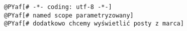 \begin{Verbatim}[commandchars=@\[\]]
@PYaf[# -*- coding: utf-8 -*-]
@PYaf[# named scope parametryzowany]
@PYaf[# dodatkowo chcemy wyświetlić posty z marca]
\end{Verbatim}
